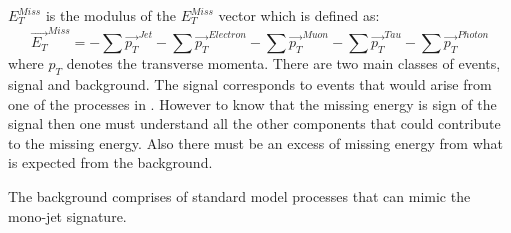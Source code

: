 $E_T^{Miss}$ is the modulus of the $E_T^{Miss}$ vector which is defined as:
\begin{equation}\label{eq:etmiss}
\vec{E_T}^{Miss} = - \sum \vec{p_T}^{Jet} - \sum \vec{p_T}^{Electron} - \sum \vec{p_T}^{Muon} - \sum \vec{p_T}^{Tau} - \sum \vec{p_T}^{Photon}
\end{equation}  
where $p_T$ denotes the transverse momenta.
There are two main classes of events, signal and background. 
The signal corresponds to events that would arise from one of the processes in . However to know that the missing energy is sign of the signal then one must understand all the other components that could contribute to the missing energy. Also there must be an excess of missing energy from what is expected from the background.

The background comprises of standard model processes that can mimic the mono-jet signature.
